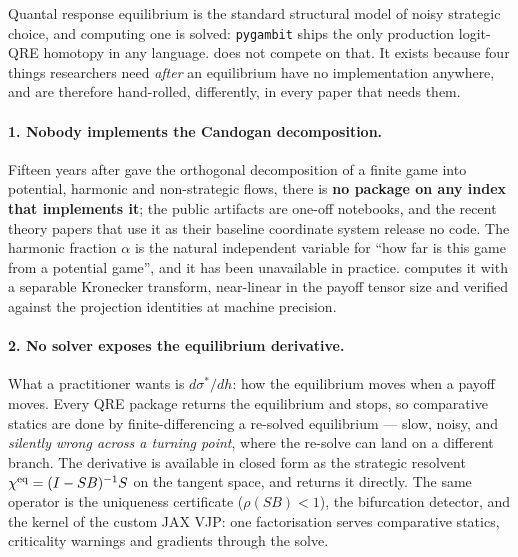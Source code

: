 Quantal response equilibrium \citep{mckelvey1995} is the standard structural
model of noisy strategic choice, and computing one is solved: \texttt{pygambit}
\citep{gambit} ships the only production logit-QRE homotopy in any language.
\strataq{} does not compete on that. It exists because four things researchers
need \emph{after} an equilibrium have no implementation anywhere, and are
therefore hand-rolled, differently, in every paper that needs them.

\paragraph{1. Nobody implements the Candogan decomposition.} Fifteen years after
\citet{candogan2011} gave the orthogonal decomposition of a finite game into
potential, harmonic and non-strategic flows, there is \textbf{no package on any
index that implements it}; the public artifacts are one-off notebooks, and the
recent theory papers that use it as their baseline coordinate system release no
code. The harmonic fraction $\alpha$ is the natural independent variable for
``how far is this game from a potential game'', and it has been unavailable in
practice. \strataq{} computes it with a separable Kronecker transform,
near-linear in the payoff tensor size and verified against the projection
identities at machine precision.

\paragraph{2. No solver exposes the equilibrium derivative.} What a practitioner
wants is $d\sigma^*/dh$: how the equilibrium moves when a payoff moves. Every QRE
package returns the equilibrium and stops, so comparative statics are done by
finite-differencing a re-solved equilibrium --- slow, noisy, and \emph{silently
wrong across a turning point}, where the re-solve can land on a different branch.
The derivative is available in closed form as the strategic resolvent
$\chi^{\mathrm{eq}}=(I-SB)^{-1}S$ on the tangent space, and \strataq{} returns it directly.
The same operator is the uniqueness certificate ($\rho(SB)<1$), the bifurcation
detector, and the kernel of the custom JAX VJP: one factorisation serves
comparative statics, criticality warnings and gradients through the solve.

